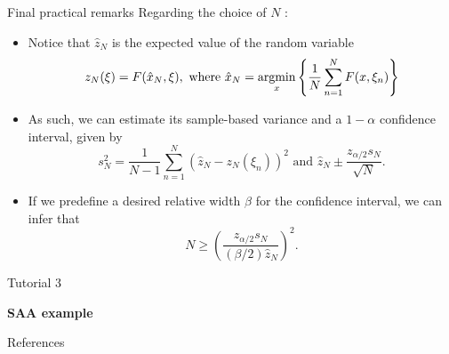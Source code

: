 \begin{frame}{Final practical remarks}
	Regarding the choice of $N$ {\small \cite{oliveira2012optimization}}:
	\begin{itemize}[<+->]
		\item Notice that $\hat{z}_N$ is the expected value of the \alert{random variable}
		$$
			z_N(\xi) = F(\hat{x}_N, \xi), \text { where } \hat{x}_N = \mathop{\rm argmin}_x \left\{ \frac{1}{N}\sum_{n=1}^N F(x,\xi_n) \right \}
		$$
		\item As such, we can estimate its sample-based variance and a $1-\alpha$ confidence interval, given by
		$$
			s_N^2 = \frac{1}{N-1}\sum_{n=1}^N (\hat{z}_N - z_N(\xi_n))^2 \text{ and } \hat{z}_N \pm \frac{z_{\alpha/2} s_N}{\sqrt{N}}.
		$$
		\item If we predefine a desired \alert{relative width} $\beta$ for the confidence interval, we can infer that
		$$
			N \ge \left(\frac{z_{\alpha/2}s_N}{(\beta/2)\hat{z}_N}\right)^2.
		$$
		
	\end{itemize}
	
\end{frame}


\begin{frame}{Tutorial 3}

\centering
\large
\bf 
SAA example

	
\end{frame}


\begin{frame}[allowframebreaks]{References}
	
	
\end{frame}


